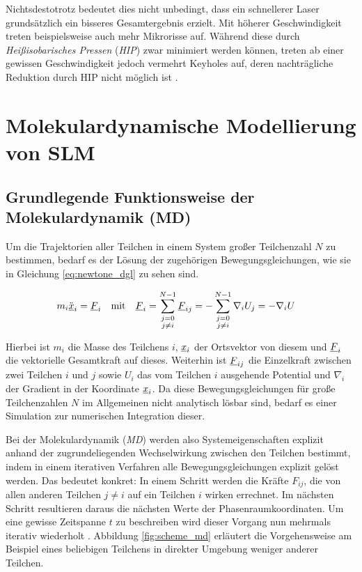 		Nichtsdestotrotz bedeutet dies nicht unbedingt, dass ein schnellerer Laser grundsätzlich
		ein bisseres Gesamtergebnis erzielt. Mit höherer Geschwindigkeit treten beispielsweise
		auch mehr Mikrorisse auf. Während diese durch \emph{Heißisobarisches Pressen} (\emph{HIP})
		zwar minimiert werden können, treten ab einer gewissen Geschwindigkeit jedoch vermehrt
		Keyholes auf, deren nachträgliche Reduktion durch HIP nicht möglich ist
		\cite{sadali2020influence}.


\section{Molekulardynamische Modellierung von SLM}
	\subsection{Grundlegende Funktionsweise der Molekulardynamik (MD)}
		Um die Trajektorien aller Teilchen in einem System großer Teilchenzahl $N$ zu bestimmen,
		bedarf es der Lösung der zugehörigen Bewegungsgleichungen, wie sie in Gleichung
		\eqref{eq:newtone_dgl} zu sehen sind.

		\begin{align}
			m_i \ddot{\underline{x}}_i &= \underline{F}_i
			& \text{mit} &&
			\underline{F}_{i} &= \sum_{\substack{j=0\\j \neq i}}^{N-1} \underline{F}_{ij}
			= -\sum_{\substack{j=0\\j \neq i}}^{N-1} \nabla_i U_j = -\nabla_i U
			\label{eq:newtone_dgl}
		\end{align}

		Hierbei ist $m_i$ die Masse des Teilchens $i$, $\underline{x}_i$ der Ortsvektor von diesem und
		$\underline{F}_{i}$ die vektorielle Gesamtkraft auf dieses. Weiterhin ist $\underline{F}_{ij}$ die
		Einzelkraft zwischen zwei Teilchen $i$ und $j$ sowie $U_i$ das vom Teilchen $i$ ausgehende
		Potential und $\nabla_i$ der Gradient in der Koordinate $\underline{x}_i$. Da diese
		Bewegungsgleichungen für große Teilchenzahlen $N$ im Allgemeinen nicht analytisch lösbar
		sind, %
		bedarf es einer Simulation zur numerischen Integration dieser.

		Bei der Molekulardynamik (\emph{MD}) werden also Systemeigenschaften explizit anhand der
		zugrundeliegenden Wechselwirkung zwischen den Teilchen bestimmt, indem in einem
		iterativen Verfahren alle Bewegungsgleichungen explizit gelöst werden. Das bedeutet
		konkret: In einem Schritt werden die Kräfte $F_{ij}$, die von allen anderen Teilchen
		$j \neq i$ auf ein Teilchen $i$ wirken errechnet. Im nächsten Schritt resultieren daraus
		die nächsten Werte der Phasenraumkoordinaten. Um eine gewisse Zeitspanne $t$ zu
		beschreiben wird dieser Vorgang nun mehrmals iterativ wiederholt
		\cite{allen2004introduction}. Abbildung \ref{fig:scheme_md} erläutert die Vorgehensweise
		am Beispiel eines beliebigen Teilchens in direkter Umgebung weniger anderer Teilchen.

